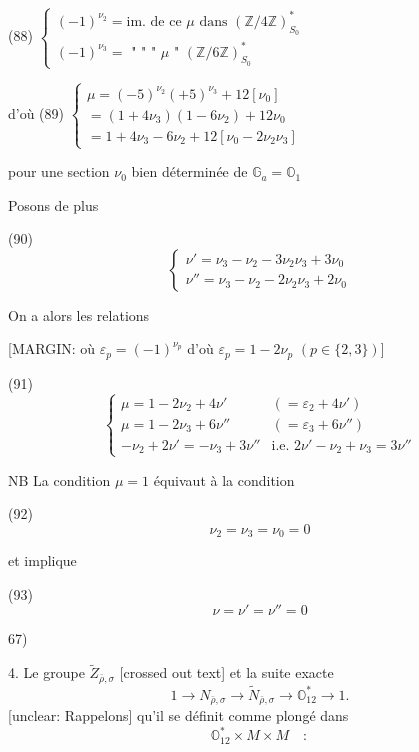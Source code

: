 (88) $\begin{cases} (-1)^{\nu_2} = \text{im. de ce } \mu \text{ dans } (\mathbb{Z}/4\mathbb{Z})^*_{S_0} \\ (-1)^{\nu_3} = \text{ " " " } \mu \text{ " } (\mathbb{Z}/6\mathbb{Z})^*_{S_0} \end{cases}$

d'où
(89) $\begin{cases} \mu = (-5)^{\nu_2} (+5)^{\nu_3} + 12 [\nu_0] \\ = (1+4\nu_3)(1-6\nu_2) + 12 \nu_0 \\ = 1 + 4\nu_3 - 6\nu_2 + 12 [ \nu_0 - 2\nu_2\nu_3 ] \end{cases}$

pour une section $\nu_0$ bien déterminée de $\mathbb{G}_a = \mathbb{O}_1$

\newpage


Posons de plus

(90)
$$ \begin{cases} \nu' = \nu_3 - \nu_2 - 3 \nu_2 \nu_3 + 3 \nu_0 \\ \nu'' = \nu_3 - \nu_2 - 2 \nu_2 \nu_3 + 2 \nu_0 \end{cases} $$

On a alors les relations

[MARGIN: où $\varepsilon_p = (-1)^{\nu_p}$
d'où $\varepsilon_p = 1 - 2\nu_p$
$(p \in \{2,3\})$]

(91)
$$ \begin{cases} \mu = 1 - 2 \nu_2 + 4 \nu' & (= \varepsilon_2 + 4 \nu') \\ \mu = 1 - 2 \nu_3 + 6 \nu'' & (= \varepsilon_3 + 6 \nu'') \\ -\nu_2 + 2 \nu' = -\nu_3 + 3 \nu'' & \text{i.e. } 2\nu' - \nu_2 + \nu_3 = 3 \nu'' \end{cases} $$

NB La condition $\mu = 1$ équivaut à la condition

(92) $$ \nu_2 = \nu_3 = \nu_0 = 0 $$

et implique

(93) $$ \nu = \nu' = \nu'' = 0 $$

\newpage


67)

4. Le groupe $\widetilde{Z}_{\bar{\rho}, \sigma}$ [crossed out text] et la suite exacte 
$$ 1 \to N_{\bar{\rho}, \sigma} \to \widetilde{N}_{\bar{\rho}, \sigma} \to \mathbb{O}_{12}^* \to 1 . $$
[unclear: Rappelons] qu'il se définit comme plongé dans
$$ \mathbb{O}_{12}^* \times M \times M \quad : $$


